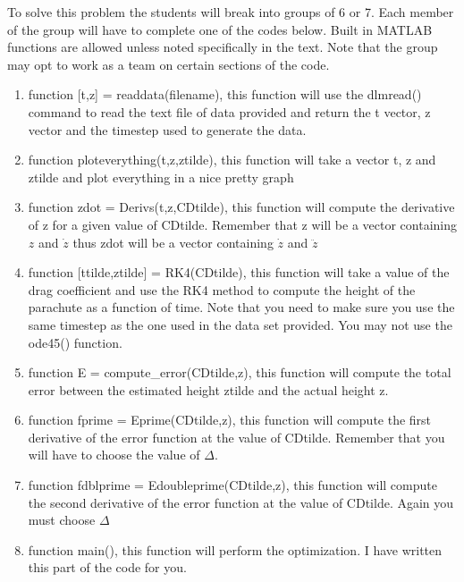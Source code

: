 \begin{enumerate}
\begin{enumerate}
\end{enumerate}

To solve this problem the students will break into groups of 6 or 7. Each
member of the group will have to complete one of the codes
below. Built in MATLAB functions are allowed unless noted specifically
in the text. Note that the group may opt to work as a team
on certain sections of the code.

\begin{enumerate}

\item function [t,z] = readdata(filename), this function will use the
  dlmread() command to read the text file of data provided and return
  the t vector, z vector and the timestep used to generate the data.

\item function ploteverything(t,z,ztilde), this function will take a
  vector t, z and ztilde and plot everything in a nice pretty graph

\item function zdot = Derivs(t,z,CDtilde), this function will compute the
  derivative of z for a given value of CDtilde. Remember that z will
  be a vector containing $z$ and $\dot{z}$ thus zdot will be a
  vector containing $\dot{z}$ and $\ddot{z}$ 

\item function [ttilde,ztilde] = RK4(CDtilde), this function will take
  a value of the drag coefficient and use the RK4 method to compute
  the height of the parachute as a function of time. Note that you
  need to make sure you use the same timestep as the one used in the
  data set provided. You may not use the ode45() function.

\item function E = compute\_error(CDtilde,z), this function will
  compute the total error between the estimated height ztilde and the
  actual height z.

\item function fprime = Eprime(CDtilde,z), this function will compute
  the first derivative of the error function at the value of
  CDtilde. Remember that you will have to choose the value of
  $\Delta$. 

\item function fdblprime = Edoubleprime(CDtilde,z), this function will
  compute the second derivative of the error function at the value of
  CDtilde. Again you must choose $\Delta$

\item function main(), this function will perform the optimization. I
  have written this part of the code for you.


\end{enumerate}
\end{enumerate}
